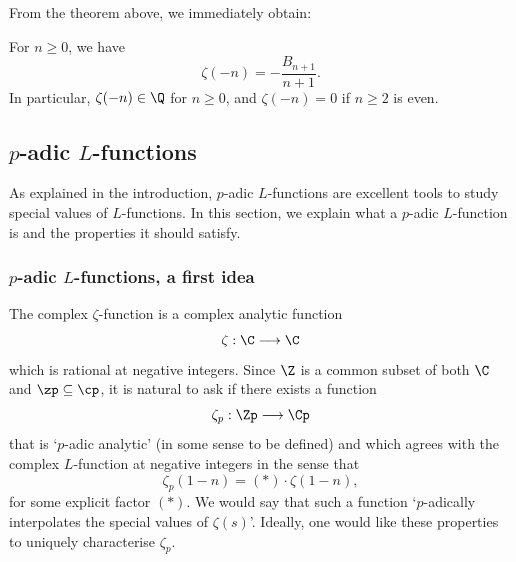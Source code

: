 \documentclass[a4paper,10pt, english, reqno]{smfart}
\numberwithin{equation}{section}
\begin{document}
From the theorem above, we immediately obtain:

\begin{corollary}\label{cor:rational}
	For $n\geq 0$, we have
	\[\zeta(-n) = -\frac{B_{n+1}}{n+1}.\]
	In particular, $\zeta(-n) \in \Q$ for $n\geq 0$, and $\zeta(-n) = 0$ if $n \geq 2$ is even.
\end{corollary}


\subsection{$p$-adic $L$-functions}\label{sec:p-adic l-functions}
As explained in the introduction, $p$-adic $L$-functions are excellent tools to study special values of $L$-functions. 
In this section, we explain what a $p$-adic $L$-function is and the properties it should satisfy.


\subsubsection{$p$-adic $L$-functions, a first idea}

The complex $\zeta$-function is a complex analytic function
\[\zeta : \C \longrightarrow \C\]
which is rational at negative integers. Since $\Z$ is a common subset of both $\C$ and $\zp \subseteq \cp$, it is natural to ask if there exists a function
\[
\zeta_p : \Zp \longrightarrow \Cp
\]
that is `$p$-adic analytic' (in some sense to be defined) and which agrees with the complex $L$-function at negative integers in the sense that
\begin{equation}\label{eq:naive interpolation}
\zeta_p(1-n) = (*) \cdot \zeta(1-n),
\end{equation}
for some explicit factor $(*)$. We would say that such a function `$p$-adically interpolates the special values of $\zeta(s)$'. Ideally, one would like these properties to uniquely characterise $\zeta_p$.
\end{document}
